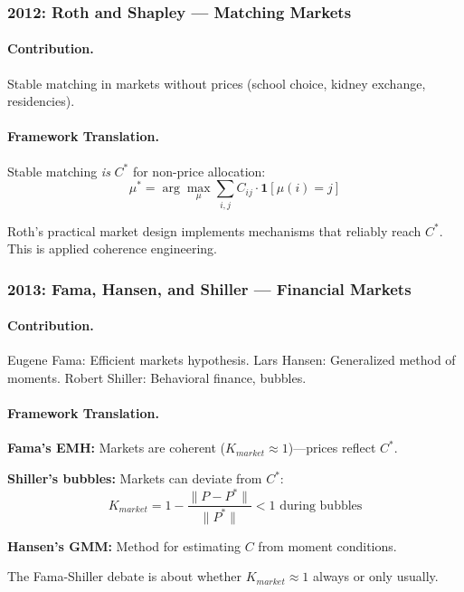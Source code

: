 \documentclass[12pt,a4paper]{article}
\begin{document}
\subsubsection{2012: Roth and Shapley --- Matching Markets}

\paragraph{Contribution.}
Stable matching in markets without prices (school choice, kidney exchange, residencies).

\paragraph{Framework Translation.}
Stable matching \emph{is} $C^*$ for non-price allocation:
\begin{equation}
  \mu^* = \arg\max_\mu \sum_{i,j} C_{ij} \cdot \mathbf{1}[\mu(i) = j]
\end{equation}

Roth's practical market design implements mechanisms that reliably reach $C^*$.
This is applied coherence engineering.

\subsubsection{2013: Fama, Hansen, and Shiller --- Financial Markets}

\paragraph{Contribution.}
Eugene Fama: Efficient markets hypothesis.
Lars Hansen: Generalized method of moments.
Robert Shiller: Behavioral finance, bubbles.

\paragraph{Framework Translation.}
\textbf{Fama's EMH:} Markets are coherent ($K_{market} \approx 1$)---prices reflect $C^*$.

\textbf{Shiller's bubbles:} Markets can deviate from $C^*$:
\begin{equation}
  K_{market} = 1 - \frac{\|P - P^*\|}{\|P^*\|} < 1 \text{ during bubbles}
\end{equation}

\textbf{Hansen's GMM:} Method for estimating $C$ from moment conditions.

The Fama-Shiller debate is about whether $K_{market} \approx 1$ always or only usually.
\end{document}
